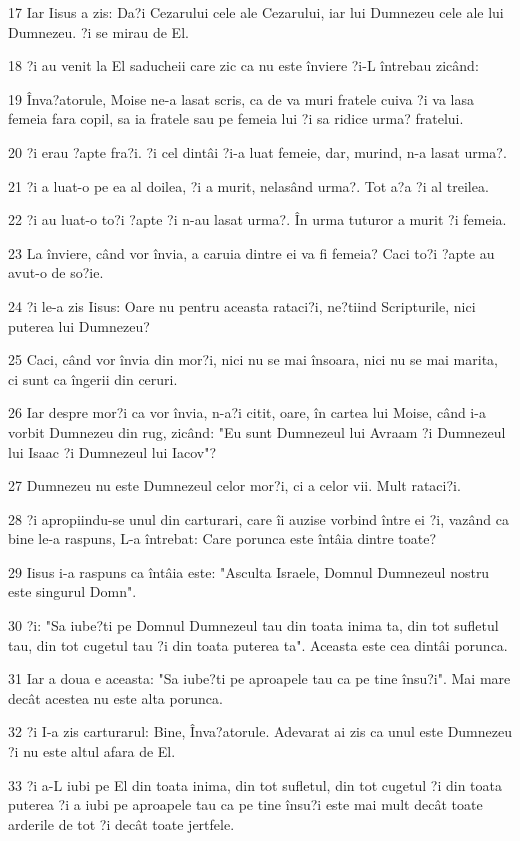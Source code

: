 \par 17 Iar Iisus a zis: Da?i Cezarului cele ale Cezarului, iar lui Dumnezeu cele ale lui Dumnezeu. ?i se mirau de El.
\par 18 ?i au venit la El saducheii care zic ca nu este înviere ?i-L întrebau zicând:
\par 19 Înva?atorule, Moise ne-a lasat scris, ca de va muri fratele cuiva ?i va lasa femeia fara copil, sa ia fratele sau pe femeia lui ?i sa ridice urma? fratelui.
\par 20 ?i erau ?apte fra?i. ?i cel dintâi ?i-a luat femeie, dar, murind, n-a lasat urma?.
\par 21 ?i a luat-o pe ea al doilea, ?i a murit, nelasând urma?. Tot a?a ?i al treilea.
\par 22 ?i au luat-o to?i ?apte ?i n-au lasat urma?. În urma tuturor a murit ?i femeia.
\par 23 La înviere, când vor învia, a caruia dintre ei va fi femeia? Caci to?i ?apte au avut-o de so?ie.
\par 24 ?i le-a zis Iisus: Oare nu pentru aceasta rataci?i, ne?tiind Scripturile, nici puterea lui Dumnezeu?
\par 25 Caci, când vor învia din mor?i, nici nu se mai însoara, nici nu se mai marita, ci sunt ca îngerii din ceruri.
\par 26 Iar despre mor?i ca vor învia, n-a?i citit, oare, în cartea lui Moise, când i-a vorbit Dumnezeu din rug, zicând: "Eu sunt Dumnezeul lui Avraam ?i Dumnezeul lui Isaac ?i Dumnezeul lui Iacov"?
\par 27 Dumnezeu nu este Dumnezeul celor mor?i, ci a celor vii. Mult rataci?i.
\par 28 ?i apropiindu-se unul din carturari, care îi auzise vorbind între ei ?i, vazând ca bine le-a raspuns, L-a întrebat: Care porunca este întâia dintre toate?
\par 29 Iisus i-a raspuns ca întâia este: "Asculta Israele, Domnul Dumnezeul nostru este singurul Domn".
\par 30 ?i: "Sa iube?ti pe Domnul Dumnezeul tau din toata inima ta, din tot sufletul tau, din tot cugetul tau ?i din toata puterea ta". Aceasta este cea dintâi porunca.
\par 31 Iar a doua e aceasta: "Sa iube?ti pe aproapele tau ca pe tine însu?i". Mai mare decât acestea nu este alta porunca.
\par 32 ?i I-a zis carturarul: Bine, Înva?atorule. Adevarat ai zis ca unul este Dumnezeu ?i nu este altul afara de El.
\par 33 ?i a-L iubi pe El din toata inima, din tot sufletul, din tot cugetul ?i din toata puterea ?i a iubi pe aproapele tau ca pe tine însu?i este mai mult decât toate arderile de tot ?i decât toate jertfele.

